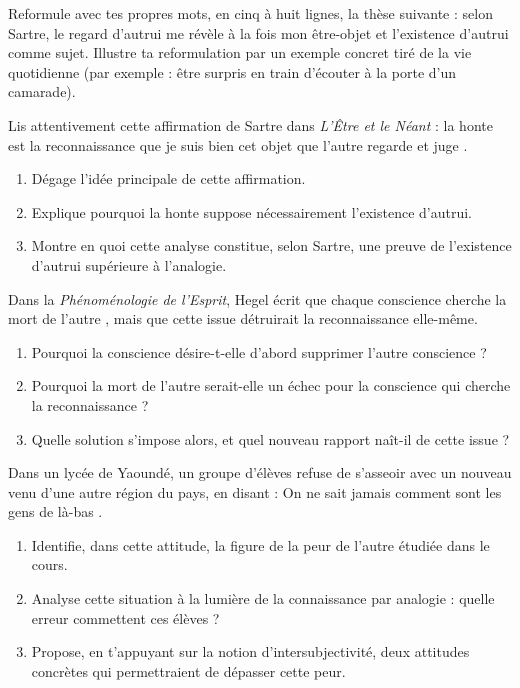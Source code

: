 \documentclass[11pt]{article}
\newcounter{popsec}
\newcounter{popsub}
\newcommand{\courssub}[1]{%
  \stepcounter{popsub}%
  \par\vspace{9pt}\noindent{\popxbold\fontsize{11.5}{13}\selectfont\color{popink}{\color{poporange}\thepopsec.\thepopsub}\hspace{6pt}#1}\par\nopagebreak\vspace{4pt}
}
\begin{document}
\courssub{Je m'entraîne}

\begin{exercice}
Reformule avec tes propres mots, en cinq à huit lignes, la thèse suivante : selon Sartre, le regard d'autrui me révèle à la fois mon être-objet et l'existence d'autrui comme sujet. Illustre ta reformulation par un exemple concret tiré de la vie quotidienne (par exemple : être surpris en train d'écouter à la porte d'un camarade).
\end{exercice}

\begin{exercice}
Lis attentivement cette affirmation de Sartre dans \emph{L'Être et le Néant} : la honte est \guillemotleft la reconnaissance que je suis bien cet objet que l'autre regarde et juge \guillemotright.
\begin{enumerate}
\item Dégage l'idée principale de cette affirmation.
\item Explique pourquoi la honte suppose nécessairement l'existence d'autrui.
\item Montre en quoi cette analyse constitue, selon Sartre, une preuve de l'existence d'autrui supérieure à l'analogie.
\end{enumerate}
\end{exercice}

\begin{exercice}
Dans la \emph{Phénoménologie de l'Esprit}, Hegel écrit que chaque conscience \guillemotleft cherche la mort de l'autre \guillemotright, mais que cette issue détruirait la reconnaissance elle-même.
\begin{enumerate}
\item Pourquoi la conscience désire-t-elle d'abord supprimer l'autre conscience ?
\item Pourquoi la mort de l'autre serait-elle un échec pour la conscience qui cherche la reconnaissance ?
\item Quelle solution s'impose alors, et quel nouveau rapport naît-il de cette issue ?
\end{enumerate}
\end{exercice}

\begin{exercice}
Dans un lycée de Yaoundé, un groupe d'élèves refuse de s'asseoir avec un nouveau venu d'une autre région du pays, en disant : \guillemotleft On ne sait jamais comment sont les gens de là-bas \guillemotright.
\begin{enumerate}
\item Identifie, dans cette attitude, la figure de la peur de l'autre étudiée dans le cours.
\item Analyse cette situation à la lumière de la connaissance par analogie : quelle erreur commettent ces élèves ?
\item Propose, en t'appuyant sur la notion d'intersubjectivité, deux attitudes concrètes qui permettraient de dépasser cette peur.
\end{enumerate}
\end{exercice}
\end{document}
